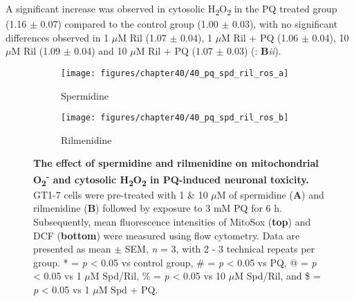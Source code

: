 A significant increase was observed in cytosolic H\textsubscript{2}O\textsubscript{2} in the PQ treated group (1.16 $\pm$ 0.07) compared to the control group (1.00 $\pm$ 0.03), with no significant differences observed in 1 $\mu$M Ril (1.07 $\pm$ 0.04), 1 $\mu$M Ril + PQ (1.06 $\pm$ 0.04), 10 $\mu$M Ril (1.09 $\pm$ 0.04) and 10 $\mu$M Ril + PQ (1.07 $\pm$ 0.03) (: \textbf{B}\textit{ii}).

\begin{figure}[!htbp]
  \center
  \begin{subfigure}[b]{0.495\linewidth}
    \texttt{[image: figures/chapter40/40\_pq\_spd\_ril\_ros\_a]}
    \caption{Spermidine}
  \end{subfigure}
  \begin{subfigure}[b]{0.495\linewidth}
    \texttt{[image: figures/chapter40/40\_pq\_spd\_ril\_ros\_b]}
    \caption{Rilmenidine}
  \end{subfigure}
  \caption[The effect of spermidine and rilmenidine on mitochondrial O\textsubscript{2}\textsuperscript{-} and cytosolic H\textsubscript{2}O\textsubscript{2} in PQ-induced neuronal toxicity]{\textbf{The effect of spermidine and rilmenidine on mitochondrial O\textsubscript{2}\textsuperscript{-} and cytosolic H\textsubscript{2}O\textsubscript{2} in PQ-induced neuronal toxicity.} GT1-7 cells were pre-treated with 1 \& 10 $\mu$M of spermidine (\textbf{A}) and rilmenidine (\textbf{B}) followed by exposure to 3 mM PQ for 6 h. Subsequently,  mean fluorescence intensities of MitoSox (\textbf{top}) and DCF (\textbf{bottom}) were measured using flow cytometry. Data are presented as mean $\pm$ SEM, \textit{n} = 3, with 2 - 3 technical repeats per group. * = \textit{p} < 0.05 vs control group, \# = \textit{p} < 0.05 vs PQ, @ = \textit{p} < 0.05 vs 1 $\mu$M Spd/Ril, \% = \textit{p} < 0.05 vs 10 $\mu$M Spd/Ril, and \$ = \textit{p} < 0.05 vs 1 $\mu$M Spd + PQ.}
  \label{fig:40_pq_spd_ril_ros_a}
\end{figure} 

